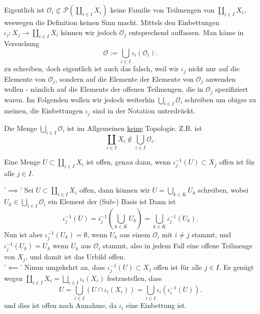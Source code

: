\begin{dabuse}
    Eigentlich ist $\mathcal{O}_i \not \subset \mathcal{P}(\coprod _{i \in I}X_i)$ keine Familie von Teilmengen von $\coprod _{i \in I}X_i$, weswegen die Definition keinen Sinn macht. Mittels den Einbettungen $ι_j:X_j \to  \coprod _{i \in I}X_i$ können wir jedoch $\mathcal{O}_j$ entsprechend auffassen. Man käme in Versuchung
    \[
        \mathcal{O} := \bigcup_{i \in  I} ι_i(\mathcal{O}_i)
    .\] 
    zu schreiben, doch eigentlich ist auch das falsch, weil wir $ι_j$ nicht nur auf die Elemente von  $\mathcal{O}_j$, sondern auf die Elemente der Elemente von $\mathcal{O}_j$ anwenden wollen - nämlich auf die Elemente der offenen Teilmengen, die in $\mathcal{O}_j$ spezifiziert waren. Im Folgenden wollen wir jedoch weiterhin $\bigcup_{i \in  I} \mathcal{O}_i$ schreiben um obiges zu meinen, die Einbettungen $ι_j$ sind in der Notation unterdrückt.
\end{dabuse}

\begin{warning}
    Die Menge $\bigcup_{i \in  I} \mathcal{O}_i$ ist im Allgemeinen \underline{keine} Topologie. Z.B. ist
    \[
    \coprod_{i \in I}X_i \not\in \bigcup_{i \in  I} \mathcal{O}_i
    .\] 
\end{warning}

\begin{dlemma}
   Eine Menge $U\subset \coprod_{i \in I}X_i$ ist offen, genau dann, wenn $ι_j^{-1}(U)\subset X_j$ offen ist für alle $j\in I$.
\end{dlemma}

\begin{proof*}
'$\implies$'    Sei $U\subset \coprod_{i \in I}X_i$ offen, dann können wir $U = \bigcup_{k\in K}U_k$ schreiben, wobei $U_k \in \bigcup_{i \in  I} \mathcal{O}_i$ ein Element der (Sub-) Basis ist Dann ist
    \[
        ι_j^{-1} (U) = i_j^{-1} \left( \bigcup_{k\in K} U_k \right)  = \bigcup_{k\in K} ι_j^{-1}(U_k) 
    .\] 
    Nun ist aber $ι_j^{-1}(U_k) =\emptyset$, wenn $U_k$ aus einem  $\mathcal{O}_i$ mit $i\neq j$ stammt, und $ι_j^{-1}(U_k) = U_k$ wenn $U_k$ aus  $\mathcal{O}_i$ stammt, also in jedem Fall eine offene Teilmenge von $X_j$, und damit ist das Urbild offen. \\
    '$\impliedby$' Nimm umgekehrt an, dass $ι_j^{-1}(U)\subset X_j$ offen ist für alle $j\in I$. Es genügt wegen $\coprod _{i \in I}X_i = \bigsqcup_{i \in I}ι_i(X_i)$ festzustellen, dass
    \[
        U = \bigcup_{i \in  I} (U \cap ι_i(X_i)) = \bigcup _{i \in I}ι_i(ι_i^{-1}(U))
    .\] 
    und dies ist offen nach Annahme, da $ι_i$ eine Einbettung ist.
\end{proof*}

